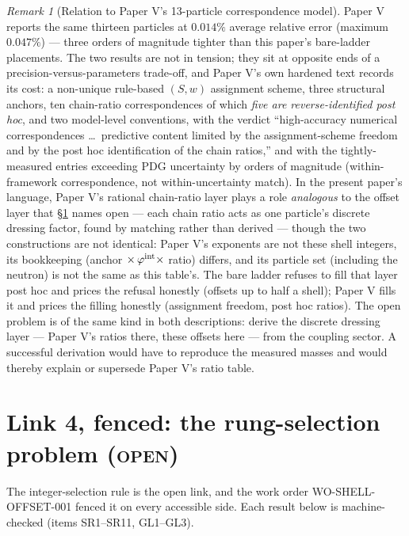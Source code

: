 \documentclass[12pt]{article}
\theoremstyle{definition}
\theoremstyle{remark}
\newtheorem{remark}[theorem]{Remark}
\begin{document}
\begin{remark}[Relation to Paper V's 13-particle correspondence model]\label{rem:paperv}
Paper V \citep{SmartV} reports the same thirteen particles at $0.014\%$ average relative error (maximum $0.047\%$) --- three orders of magnitude tighter than this paper's bare-ladder placements. The two results are not in tension; they sit at opposite ends of a precision-versus-parameters trade-off, and Paper V's own hardened text records its cost: a non-unique rule-based $(S, w)$ assignment scheme, three structural anchors, ten chain-ratio correspondences of which \emph{five are reverse-identified post hoc}, and two model-level conventions, with the verdict ``high-accuracy numerical correspondences \ldots\ predictive content limited by the assignment-scheme freedom and by the post hoc identification of the chain ratios,'' and with the tightly-measured entries exceeding PDG uncertainty by orders of magnitude (within-framework correspondence, not within-uncertainty match). In the present paper's language, Paper V's rational chain-ratio layer plays a role \emph{analogous} to the offset layer that \S\ref{sec:fence} names open --- each chain ratio acts as one particle's discrete dressing factor, found by matching rather than derived --- though the two constructions are not identical: Paper V's exponents are not these shell integers, its bookkeeping (anchor $\times\,\varphi^{\rm int}\times$ ratio) differs, and its particle set (including the neutron) is not the same as this table's. The bare ladder refuses to fill that layer post hoc and prices the refusal honestly (offsets up to half a shell); Paper V fills it and prices the filling honestly (assignment freedom, post hoc ratios). The open problem is of the same kind in both descriptions: derive the discrete dressing layer --- Paper V's ratios there, these offsets here --- from the coupling sector. A successful derivation would have to reproduce the measured masses and would thereby explain or supersede Paper V's ratio table.
\end{remark}

\section{Link 4, fenced: the rung-selection problem (\textsc{open})}\label{sec:fence}

The integer-selection rule is the open link, and the work order WO-SHELL-OFFSET-001 fenced it on every accessible side. Each result below is machine-checked (items SR1--SR11, GL1--GL3).
\end{document}
